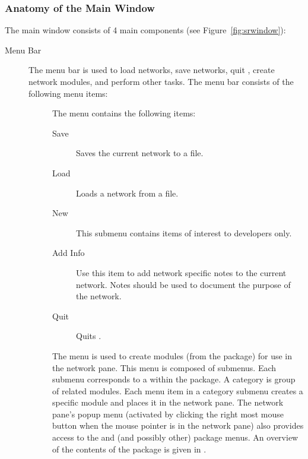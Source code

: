 \subsubsection{Anatomy of the Main Window}
\label{sec:windowanatomy}

The \sr{} main window consists of 4 main components (see
Figure~\ref{fig:srwindow}): 

\begin{description}
\item[Menu Bar] The menu bar is used to load networks, save networks, quit
  \sr, create network modules, and perform other tasks.  The menu bar
  consists of the following menu items:

  \begin{description}
  \item[] The  menu contains the following items:
    \begin{description}
    \item[Save] Saves the current network to a file.
    \item[Load] Loads a network from a file.
    \item[New] This submenu contains items of interest to developers only.
    \item[Add Info] Use this item to add network specific notes to
      the current network.  Notes should be used to document the purpose of
      the network.
    \item[Quit] Quits \sr.
    \end{description}
  \end{description}
  
  \begin{description}
  \item[] The  menu is used to create modules
    (from the \sr{} package) for use in the network pane.  This menu is
    composed of submenus. Each submenu corresponds to a 
     within the \sr{} package.  A category is group of
    related modules.  Each menu item in a category submenu creates a
    specific module and places it in the network pane.  The network pane's
    popup menu (activated by clicking the right most mouse button when the
    mouse pointer is in the network pane) also provides access to the
    \menu{\sr{}} and \menu{\pse{}} (and possibly other) package menus.  An
    overview of the contents of the \sr{} package is given in .
  \end{description}


\end{description}
